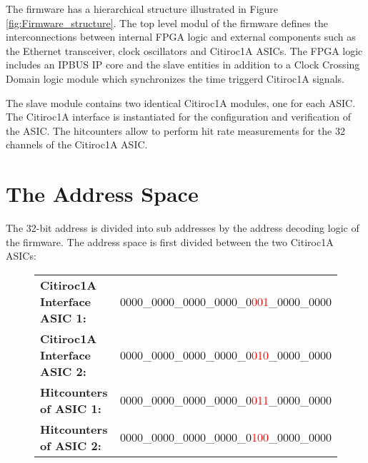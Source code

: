 The firmware has a hierarchical structure illustrated in Figure \ref{fig:Firmware_structure}. 
\newline
The top level modul of the firmware defines the interconnections between internal FPGA logic and external components such as the Ethernet transceiver, clock oscillators and Citiroc1A ASICs.
\newline
The FPGA logic includes an IPBUS IP core and the slave entities in addition to a Clock Crossing Domain logic module which synchronizes the time triggerd Citiroc1A signals. 
\newline

The slave module contains two identical Citiroc1A modules, one for each ASIC. The Citiroc1A interface is instantiated for the configuration and verification of the ASIC.
The hitcounters allow to perform hit rate measurements for the 32 channels of the Citiroc1A ASIC. 
\section{The Address Space}
The 32-bit address is divided into sub addresses by the address decoding logic of the firmware.
\newline
The address space is first divided between the two Citiroc1A ASICs:
\begin{figure}[H]
    \centering
\begin{tabular}{p{7cm} l}
    \textbf{Citiroc1A Interface ASIC 1:} & 0000\_0000\_0000\_0000\_0\textcolor{red}{001}\_0000\_0000 \\
    \textbf{Citiroc1A Interface ASIC 2:} & 0000\_0000\_0000\_0000\_0\textcolor{red}{010}\_0000\_0000 \\
    \textbf{Hitcounters of ASIC 1:} & 0000\_0000\_0000\_0000\_0\textcolor{red}{011}\_0000\_0000 \\
    \textbf{Hitcounters of ASIC 2: } & 0000\_0000\_0000\_0000\_0\textcolor{red}{100}\_0000\_0000\\
\end{tabular}
\end{figure}

